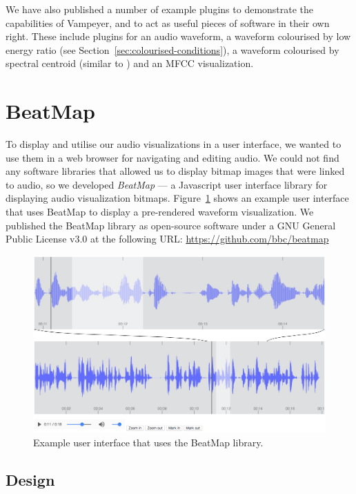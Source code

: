 We have also published a number of example plugins to demonstrate the capabilities of Vampeyer, and to act as
useful pieces of software in their own right.  These include plugins for an audio waveform, a waveform colourised by
low energy ratio (see Section~\ref{sec:colourised-conditions}), a waveform colourised by spectral centroid (similar to
\citet{Akkermans2011}) and an MFCC visualization.

\clearpage
\section{BeatMap}\label{sec:beatmap}

To display and utilise our audio visualizations in a user interface, we wanted to use them in a web browser for
navigating and editing audio. We could not find any software libraries that allowed us to display bitmap images that
were linked to audio, so we developed \textit{BeatMap} --- a Javascript user interface library for displaying audio
visualization bitmaps.  Figure~\ref{fig:beatmap} shows an example user interface that uses BeatMap to display a
pre-rendered waveform visualization.  We published the BeatMap library as open-source software under a GNU General
Public License v3.0 at the following URL: \url{https://github.com/bbc/beatmap}

\begin{figure}[h]
\centering
  \includegraphics[width=\textwidth]{figs/beatmap.png}
  \caption{Example user interface that uses the BeatMap library.}
  \label{fig:beatmap}
\end{figure}

\subsection{Design}

